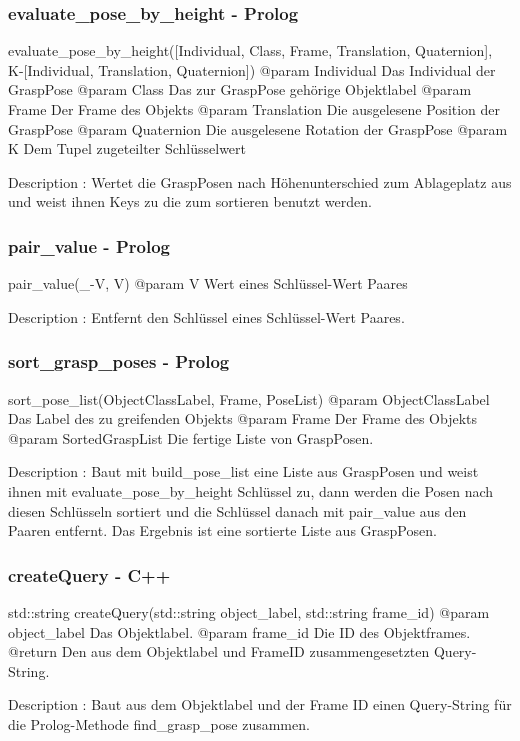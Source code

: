 \documentclass{suturo}
\begin{document}
\subsubsection{evaluate\_pose\_by\_height - Prolog}
\begin{spverbatim}
evaluate_pose_by_height([Individual, Class, Frame, Translation, Quaternion], 
                        K-[Individual, Translation, Quaternion])
@param Individual Das Individual der GraspPose
@param Class Das zur GraspPose gehörige Objektlabel
@param Frame Der Frame des Objekts
@param Translation Die ausgelesene Position der GraspPose
@param Quaternion Die ausgelesene Rotation der GraspPose
@param K Dem Tupel zugeteilter Schlüsselwert

Description : Wertet die GraspPosen nach Höhenunterschied zum Ablageplatz aus 
und weist ihnen Keys zu die zum sortieren benutzt werden.
\end{spverbatim}

\subsubsection{pair\_value - Prolog}
\begin{spverbatim}
pair_value(_-V, V)
@param V Wert eines Schlüssel-Wert Paares

Description : Entfernt den Schlüssel eines Schlüssel-Wert Paares.
\end{spverbatim}

\subsubsection{sort\_grasp\_poses - Prolog}
\begin{spverbatim}
sort_pose_list(ObjectClassLabel, Frame, PoseList)
@param ObjectClassLabel Das Label des zu greifenden Objekts
@param Frame Der Frame des Objekts
@param SortedGraspList Die fertige Liste von GraspPosen.

Description : Baut mit build_pose_list eine Liste aus GraspPosen und weist 
ihnen mit evaluate_pose_by_height Schlüssel zu, dann werden die Posen nach 
diesen Schlüsseln sortiert und die Schlüssel danach mit pair_value aus den 
Paaren entfernt. Das Ergebnis ist eine sortierte Liste aus GraspPosen.
\end{spverbatim}

\subsubsection{createQuery - C++}
\begin{spverbatim}
std::string createQuery(std::string object_label, std::string frame_id)
@param object_label Das Objektlabel.
@param frame_id Die ID des Objektframes.
@return Den aus dem Objektlabel und FrameID zusammengesetzten Query-String.

Description : Baut aus dem Objektlabel und der Frame ID einen Query-String 
für die Prolog-Methode find_grasp_pose zusammen.
\end{spverbatim}
\end{document}

